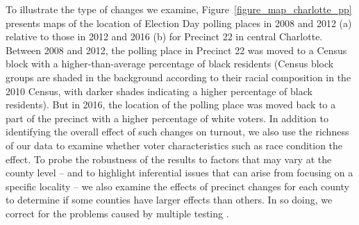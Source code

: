 \documentclass{cup_PSRM}
\begin{document}
To illustrate the type of changes we examine, Figure~\ref{figure_map_charlotte_pp} presents maps of the location of Election Day polling places in 2008 and 2012 (a) relative to those in 2012 and 2016 (b) for Precinct 22 in central Charlotte.  Between 2008 and 2012, the polling place in Precinct 22 was moved to a Census block with a higher-than-average percentage of black residents (Census block groups are shaded in the background according to their racial composition in the 2010 Census, with darker shades indicating a higher percentage of black residents).  But in 2016, the location of the polling place was moved back to a part of the precinct with a higher percentage of white voters.  In addition to identifying the overall effect of such changes on turnout, we also use the richness of our data to examine whether voter characteristics such as race condition the effect.  To probe the robustness of the results to factors that may vary at the county level -- and to highlight inferential issues that can arise from focusing on a specific locality -- we also examine the effects of precinct changes for each county to determine if some counties have larger effects than others. In so doing, we correct for the problems caused by multiple testing \citet{Benjamini:2006gd}.
\end{document}
